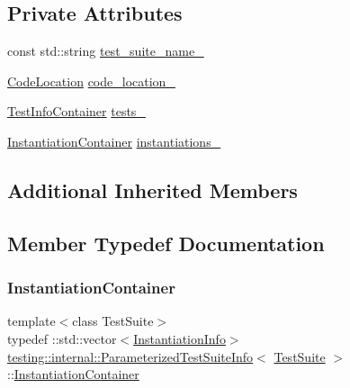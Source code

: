 \subsection*{Private Attributes}
\begin{DoxyCompactItemize}
\item 
const std\+::string \hyperlink{classtesting_1_1internal_1_1ParameterizedTestSuiteInfo_a59effa7c65294abcc39772281f97f13f}{test\+\_\+suite\+\_\+name\+\_\+}
\item 
\hyperlink{structtesting_1_1internal_1_1CodeLocation}{Code\+Location} \hyperlink{classtesting_1_1internal_1_1ParameterizedTestSuiteInfo_a64949444440296996cd9ee66e270a459}{code\+\_\+location\+\_\+}
\item 
\hyperlink{classtesting_1_1internal_1_1ParameterizedTestSuiteInfo_a0578de1b5b1852655771349b785d7fb7}{Test\+Info\+Container} \hyperlink{classtesting_1_1internal_1_1ParameterizedTestSuiteInfo_a44e991246e79e6587ffd35533ab4e2d3}{tests\+\_\+}
\item 
\hyperlink{classtesting_1_1internal_1_1ParameterizedTestSuiteInfo_a65cee35a4b9653272b6017640816eb68}{Instantiation\+Container} \hyperlink{classtesting_1_1internal_1_1ParameterizedTestSuiteInfo_a7334ea96f0aab82af68c36e3c62c49ab}{instantiations\+\_\+}
\end{DoxyCompactItemize}
\subsection*{Additional Inherited Members}


\subsection{Member Typedef Documentation}
\mbox{\label{classtesting_1_1internal_1_1ParameterizedTestSuiteInfo_a65cee35a4b9653272b6017640816eb68}} 
\subsubsection{\texorpdfstring{Instantiation\+Container}{InstantiationContainer}}
{\footnotesize\ttfamily template$<$class Test\+Suite$>$ \\
typedef \+::std\+::vector$<$\hyperlink{structtesting_1_1internal_1_1ParameterizedTestSuiteInfo_1_1InstantiationInfo}{Instantiation\+Info}$>$ \hyperlink{classtesting_1_1internal_1_1ParameterizedTestSuiteInfo}{testing\+::internal\+::\+Parameterized\+Test\+Suite\+Info}$<$ \hyperlink{classtesting_1_1TestSuite}{Test\+Suite} $>$\+::\hyperlink{classtesting_1_1internal_1_1ParameterizedTestSuiteInfo_a65cee35a4b9653272b6017640816eb68}{Instantiation\+Container}\hspace{0.3cm}{\ttfamily [private]}}


